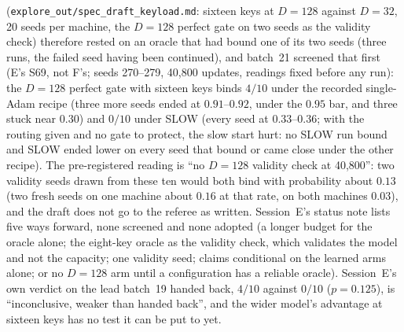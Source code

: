 \documentclass[11pt]{article}
\begin{document}
(\texttt{explore\_out/spec\_draft\_keyload.md}: sixteen keys at $D = 128$ against $D = 32$, 20 seeds per machine, the $D = 128$ perfect gate on two seeds as the validity check) therefore rested on an oracle that had bound one of its two seeds (three runs, the failed seed having been continued), and batch~21 screened that first (E's S69, not F's; seeds 270--279, 40{,}800 updates, readings fixed before any run): the $D = 128$ perfect gate with sixteen keys binds $4/10$ under the recorded single-Adam recipe (three more seeds ended at $0.91$--$0.92$, under the $0.95$ bar, and three stuck near $0.30$) and $0/10$ under SLOW (every seed at $0.33$--$0.36$; with the routing given and no gate to protect, the slow start hurt: no SLOW run bound and SLOW ended lower on every seed that bound or came close under the other recipe). The pre-registered reading is ``no $D = 128$ validity check at 40{,}800'': two validity seeds drawn from these ten would both bind with probability about $0.13$ (two fresh seeds on one machine about $0.16$ at that rate, on both machines $0.03$), and the draft does not go to the referee as written. Session~E's status note lists five ways forward, none screened and none adopted (a longer budget for the oracle alone; the eight-key oracle as the validity check, which validates the model and not the capacity; one validity seed; claims conditional on the learned arms alone; or no $D = 128$ arm until a configuration has a reliable oracle). Session~E's own verdict on the lead batch~19 handed back, $4/10$ against $0/10$ ($p = 0.125$), is ``inconclusive, weaker than handed back'', and the wider model's advantage at sixteen keys has no test it can be put to yet.
\end{document}
